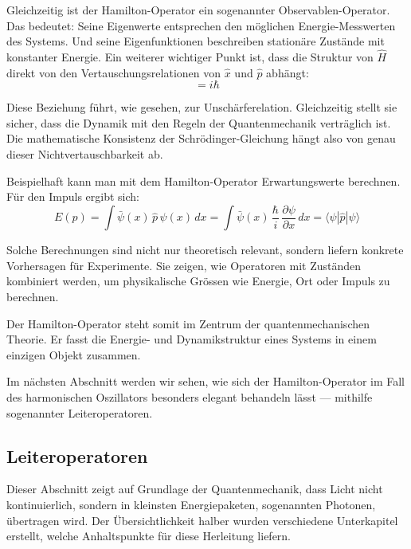 		Gleichzeitig ist der Hamilton-Operator ein sogenannter Observablen-Operator.
		Das bedeutet:
		Seine Eigenwerte entsprechen den möglichen Energie-Messwerten des Systems.
		Und seine Eigenfunktionen beschreiben stationäre Zustände mit konstanter Energie.
		Ein weiterer wichtiger Punkt ist, dass die Struktur von \( \hat{H} \) direkt von den Vertauschungsrelationen von \( \hat{x} \) und \( \hat{p} \) abhängt:
		\begin{equation}
			[\hat{x}, \hat{p}] = i \hbar
		\end{equation}

		Diese Beziehung führt, wie gesehen, zur Unschärferelation.
		Gleichzeitig stellt sie sicher, dass die Dynamik mit den Regeln der Quantenmechanik verträglich ist.
		Die mathematische Konsistenz der Schrödinger-Gleichung hängt also von genau dieser Nichtvertauschbarkeit ab.

		Beispielhaft kann man mit dem Hamilton-Operator Erwartungswerte berechnen.
		Für den Impuls ergibt sich:
		\begin{equation}
			E(p) = \int \bar{\psi}(x) \, \hat{p} \, \psi(x) \, dx 
			= \int \bar{\psi}(x) \, \frac{\hbar}{i} \, \frac{\partial \psi}{\partial x} \, dx 
			= \langle \psi | \hat{p} | \psi \rangle
		\end{equation}


		Solche Berechnungen sind nicht nur theoretisch relevant, sondern liefern konkrete Vorhersagen für Experimente.
		Sie zeigen, wie Operatoren mit Zuständen kombiniert werden, um physikalische Grössen wie Energie, Ort oder Impuls zu berechnen.

		Der Hamilton-Operator steht somit im Zentrum der quantenmechanischen Theorie.
		Er fasst die Energie- und Dynamikstruktur eines Systems in einem einzigen Objekt zusammen.

		Im nächsten Abschnitt werden wir sehen, wie sich der Hamilton-Operator im Fall des harmonischen Oszillators besonders elegant behandeln lässt ---
		mithilfe sogenannter Leiteroperatoren.

	\subsection{Leiteroperatoren\label{fourier:subsection:Leiteroperatoren}}
		Dieser Abschnitt zeigt auf Grundlage der Quantenmechanik, dass Licht nicht kontinuierlich, sondern in kleinsten Energiepaketen, sogenannten Photonen, übertragen wird.
		Der Übersichtlichkeit halber wurden verschiedene Unterkapitel erstellt, welche Anhaltspunkte für diese Herleitung liefern.

